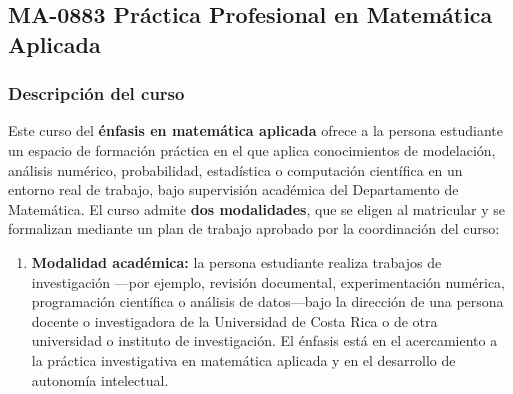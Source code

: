 \newpage
\subsection*{MA-0883 Práctica Profesional en Matemática Aplicada}

\hypertarget{MA0883}{}
\begin{refsection}
\begin{table}[H]
\end{table}

\subsubsection*{Descripción del curso}

Este curso del \textbf{énfasis en matemática aplicada} ofrece a la persona estudiante un espacio de formación práctica en el que aplica conocimientos de modelación, análisis numérico, probabilidad, estadística o computación científica en un entorno real de trabajo, bajo supervisión académica del Departamento de Matemática. El curso admite \textbf{dos modalidades}, que se eligen al matricular y se formalizan mediante un plan de trabajo aprobado por la coordinación del curso:

\begin{enumerate}
\item \textbf{Modalidad académica:} la persona estudiante realiza trabajos de investigación ---por ejemplo, revisión documental, experimentación numérica, programación científica o análisis de datos---bajo la dirección de una persona docente o investigadora de la Universidad de Costa Rica o de otra universidad o instituto de investigación. El énfasis está en el acercamiento a la práctica investigativa en matemática aplicada y en el desarrollo de autonomía intelectual.


\end{enumerate}
\end{refsection}
